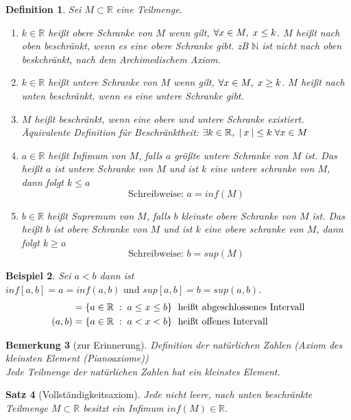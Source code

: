 \documentclass[a4paper,titlepage,oneside]{article}
\def\N{\ensuremath{\mathbb{N}} }
\def\R{\ensuremath{\mathbb{R}} }
\newcommand{\fa}{\ensuremath{\forall}}
\newcommand{\abs}[1]{\ensuremath{\left|\:#1\:\right|}}
\def\sp{\hspace{0,1cm}}
\newcommand{\menge}[2]{\ensuremath{\{#1\sp : \sp #2\}}}
\theoremstyle{thmstyle}
\newtheorem{satz}{Satz}[subsection]
\newtheorem{defi}[satz]{Definition}
\newtheorem{bsp}[satz]{Beispiel}
\newtheorem{bem}[satz]{Bemerkung}
\begin{document}
\begin{defi}
Sei \(M \subset \R\) eine Teilmenge.\begin{enumerate}
\item \(k \in \R\) heißt obere Schranke von \(M\) wenn gilt, \(\fa x \in M,\sp x \le k\). \(M\) heißt nach oben beschränkt, wenn es eine obere Schranke gibt.
zB \N ist nicht nach oben beskchränkt, nach dem Archimedischem Axiom.
\item \(k \in \R \) heißt untere Schranke von \(M\) wenn gilt, \(\fa x \in M,\sp x \ge k\). \(M\) heißt nach unten beschränkt, wenn es eine untere Schranke gibt.
\item \(M\) heißt beschränkt, wenn eine obere und untere Schranke existiert. 
Äquivalente Definition für Beschränktheit: \(\exists k \in \R,\sp \abs{x} \le k \sp \fa x \in M\)
\item \(a \in \R\) heißt Infimum von \(M\), falls \(a\) größte untere Schranke von \(M\) ist. Das heißt \(a\) ist untere Schranke von \(M\) und ist \(k\) eine untere schranke von \(M\), dann folgt \(k \le a\)
\[\text{Schreibweise: } a = inf(M)\]
\item \(b \in \R\) heißt Supremum von \(M\), falls \(b\) kleinste obere Schranke von \(M\) ist. Das heißt \(b\) ist obere Schranke von \(M\) und ist \(k\) eine obere schranke von \(M\), dann folgt \(k \ge a\)
\[\text{Schreibweise: } b = sup(M)\]
\end{enumerate}
\end{defi}

\begin{bsp}
Sei \(a < b\) dann ist \(inf[a,b] = a = inf(a,b) \text{ und } sup[a,b] = b = sup(a,b)\).
\begin{align*}
[a, b] = &\sp \menge{a \in \R}{a \le x \le b} \sp \text{ heißt abgeschlossenes Intervall}\\
(a, b) = &\sp \menge{a \in \R}{a < x < b} \sp \text{ heißt offenes Intervall}
\end{align*}
\end{bsp}

\begin{bem}[zur Erinnerung]
Definition der natürlichen Zahlen (Axiom des kleinsten Element (Pianoaxiome)) \\
Jede Teilmenge der natürlichen Zahlen hat ein kleinstes Element.
\end{bem}

\begin{satz}[Vollständigkeitsaxiom]
Jede nicht leere, nach unten beschränkte Teilmenge \(M \subset \R\)  besitzt ein Infimum \(inf(M) \in \R\).
\end{satz}
\end{document}

